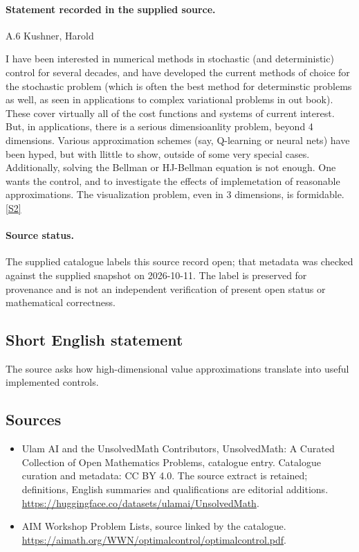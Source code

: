 \documentclass[11pt]{article}
\begin{document}
\paragraph{Statement recorded in the supplied source.}
A.6 Kushner, Harold

I have been interested in numerical methods in stochastic (and deterministic) control for several decades, and have developed the current methods of choice for the stochastic problem (which is often the best method for determinstic problems as well, as seen in applications to complex variational problems in out book). These cover virtually all of the cost functions and systems of current interest. But, in applications, there is a serious dimensioanlity problem, beyond 4 dimensions. Various approximation schemes (say, Q-learning or neural nets) have been hyped, but with llittle to show, outside of some very special cases. Additionally, solving the Bellman or HJ-Bellman equation is not enough. One wants the control, and to investigate the effects of implemetation of reasonable approximations. The visualization problem, even in 3 dimensions, is formidable. \href{https://aimath.org/WWN/optimalcontrol/optimalcontrol.pdf}{[S2]}
\paragraph{Source status.}
The supplied catalogue labels this source record open; that metadata was checked against the supplied snapshot on 2026-10-11. The label is preserved for provenance and is not an independent verification of present open status or mathematical correctness.
\subsection{Short English statement}
The source asks how high-dimensional value approximations translate into useful implemented controls.
\subsection{Sources}
\begin{itemize}
\item[S1] Ulam AI and the UnsolvedMath Contributors, UnsolvedMath: A Curated Collection of Open Mathematics Problems, catalogue entry. Catalogue curation and metadata: CC BY 4.0. The source extract is retained; definitions, English summaries and qualifications are editorial additions.
\url{https://huggingface.co/datasets/ulamai/UnsolvedMath}.
\item[S2] AIM Workshop Problem Lists, source linked by the catalogue.
\url{https://aimath.org/WWN/optimalcontrol/optimalcontrol.pdf}.
\end{itemize}
\end{document}
